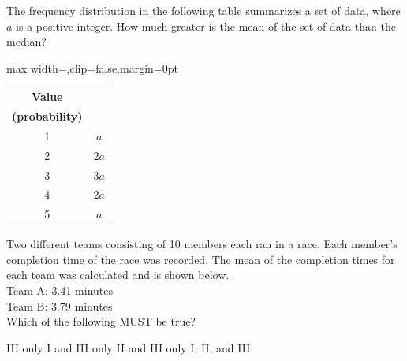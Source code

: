 \question[1]
The frequency distribution in the following table summarizes a set of data, where $a$ is a positive integer. How much greater is the mean of the set of data than the median?
\begin{center}
  \renewcommand{\arraystretch}{1.3}
  \setlength{\tabcolsep}{0.5em}
  \label{tab:sat-drill-07-value-freq-prob}%
  \vspace{0.35em}
  \begin{adjustbox}{max width=\linewidth,clip=false,margin=0pt}
  \begin{tabular}{|c|c|}
    \hline
    \cellcolor[HTML]{E0E0E0}\textbf{Value} &
    \cellcolor[HTML]{E0E0E0}\makecell{\textbf{Frequency}\\\textbf{(probability)}} \\
    \hline
    1 & $a$ \\
    \hline
    2 & $2a$ \\
    \hline
    3 & $3a$ \\
    \hline
    4 & $2a$ \\
    \hline
    5 & $a$ \\
    \hline
  \end{tabular}
  \end{adjustbox}
\end{center}
\begin{choices}
\end{choices}

\newpage

\question[1]
Two different teams consisting of 10 members each ran in a race. Each member's completion time of the race was recorded. The mean of the completion times for each team was calculated and is shown below.\\
Team A: 3.41 minutes\\
Team B: 3.79 minutes\\
Which of the following MUST be true?
\begin{choices}
  \CorrectChoice III only
  \choice I and III only
  \choice II and III only
  \choice I, II, and III
\end{choices}

